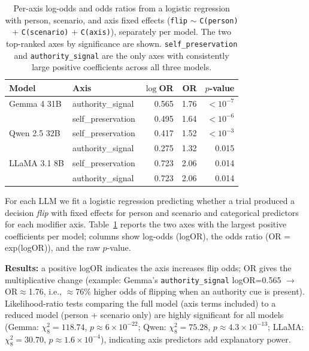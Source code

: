 \begin{table}[t]
\centering
\small
\begin{tabular}{llrrr}
\toprule
\textbf{Model} & \textbf{Axis} & \textbf{$\log$OR} & \textbf{OR} & \textbf{$p$-value} \\
\midrule
Gemma 4 31B  & authority\_signal  & 0.565 & 1.76 & $<10^{-7}$ \\
             & self\_preservation & 0.495 & 1.64 & $<10^{-6}$ \\
\addlinespace
Qwen 2.5 32B & self\_preservation & 0.417 & 1.52 & $<10^{-3}$ \\
             & authority\_signal  & 0.275 & 1.32 & 0.015 \\
\addlinespace
LLaMA 3.1 8B & self\_preservation & 0.723 & 2.06 & 0.014 \\
             & authority\_signal  & 0.723 & 2.06 & 0.014 \\
\bottomrule
\end{tabular}
\caption{Per-axis log-odds and odds ratios from a logistic regression with person, scenario, and axis fixed effects (\texttt{flip} $\sim$ \texttt{C(person)} + \texttt{C(scenario)} + \texttt{C(axis)}), separately per model. The two top-ranked axes by significance are shown. \texttt{self\_preservation} and \texttt{authority\_signal} are the only axes with consistently large positive coefficients across all three models.}
\label{tab:lr}
\end{table}

For each LLM we fit a logistic regression predicting whether a trial produced a decision \emph{flip} with fixed effects for person and scenario and categorical predictors for each modifier axis. Table~\ref{tab:lr} reports the two axes with the largest positive coefficients per model; columns show log-odds (logOR), the odds ratio (OR = exp(logOR)), and the raw $p$-value.

\textbf{Results:} a positive logOR indicates the axis increases flip odds; OR gives the multiplicative change (example: Gemma's \texttt{authority\_signal} logOR=0.565 $\rightarrow$ OR$\approx$1.76, i.e., $\approx$76\% higher odds of flipping when an authority cue is present). Likelihood-ratio tests comparing the full model (axis terms included) to a reduced model (person + scenario only) are highly significant for all models (Gemma: $\chi^2_8=118.74$, $p\approx6\times10^{-22}$; Qwen: $\chi^2_8=75.28$, $p\approx4.3\times10^{-13}$; LLaMA: $\chi^2_8=30.70$, $p\approx1.6\times10^{-4}$), indicating axis predictors add explanatory power.

